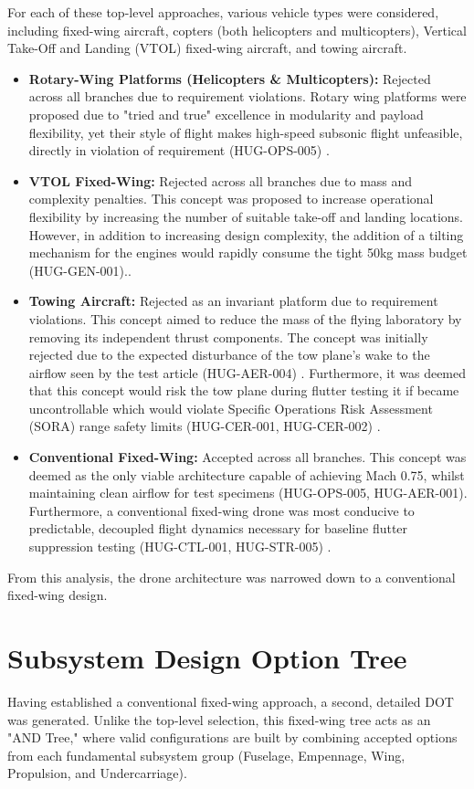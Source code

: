 For each of these top-level approaches, various vehicle types were considered, including fixed-wing aircraft, copters (both helicopters and multicopters), Vertical Take-Off and Landing (VTOL) fixed-wing aircraft, and towing aircraft.
\begin{itemize}
    \item \textbf{Rotary-Wing Platforms (Helicopters \& Multicopters):} Rejected across all branches due to requirement violations. Rotary wing platforms were proposed due to "tried and true" excellence in modularity and payload flexibility, yet their style of flight makes high-speed subsonic flight unfeasible, directly in violation of requirement (HUG-OPS-005) \cite{He2026}.
    \item \textbf{VTOL Fixed-Wing:} Rejected across all branches due to mass and complexity penalties. This concept was proposed to increase operational flexibility by increasing the number of suitable take-off and landing locations. However, in addition to increasing design complexity, the addition of a tilting mechanism for the engines would rapidly consume the tight 50kg mass budget (HUG-GEN-001).\cite{raymer1992aircraft}.
    \item \textbf{Towing Aircraft:} Rejected as an invariant platform due to requirement violations. This concept aimed to reduce the mass of the flying laboratory by removing its independent thrust components. The concept was initially rejected due to the expected disturbance of the tow plane's wake to the airflow seen by the test article (HUG-AER-004) \cite{Vos}. Furthermore, it was deemed that this concept would risk the tow plane during flutter testing it if became uncontrollable which would violate Specific Operations Risk Assessment (SORA) range safety limits (HUG-CER-001, HUG-CER-002) \cite{livne}.
    \item \textbf{Conventional Fixed-Wing:} Accepted across all branches. This concept was deemed as the only viable architecture capable of achieving Mach 0.75, whilst maintaining clean airflow for test specimens (HUG-OPS-005, HUG-AER-001). Furthermore, a conventional fixed-wing drone was most conducive to predictable, decoupled flight dynamics necessary for baseline flutter suppression testing (HUG-CTL-001, HUG-STR-005) \cite{raymer1992aircraft, Vos, Abramov2014}.
\end{itemize}

From this analysis, the drone architecture was narrowed down to a conventional fixed-wing design. 

\section{Subsystem Design Option Tree}
\label{sec:design_option_tree}
Having established a conventional fixed-wing approach, a second, detailed DOT was generated. Unlike the top-level selection, this fixed-wing tree acts as an "AND Tree," where valid configurations are built by combining accepted options from each fundamental subsystem group (Fuselage, Empennage, Wing, Propulsion, and Undercarriage). 

